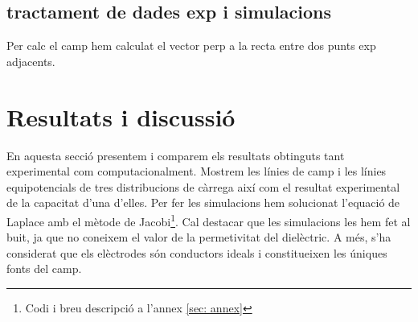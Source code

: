 \documentclass[11pt]{article}
\begin{document}
\subsection{tractament de dades exp i simulacions}
Per calc el camp hem calculat el vector perp a la recta entre dos punts exp adjacents.

\section{Resultats i discussió}\label{sec: resultats}
En aquesta secció presentem i comparem els resultats obtinguts tant experimental com computacionalment. Mostrem les línies de camp i les línies equipotencials de tres distribucions de càrrega així com el resultat experimental de la capacitat d'una d'elles. Per fer les simulacions hem solucionat l'equació de Laplace amb el mètode de Jacobi\footnote{Codi i breu descripció a l'annex \ref{sec: annex}}. Cal destacar que les simulacions les hem fet al buit, ja que no coneixem el valor de la permetivitat del dielèctric. A més, s'ha considerat que els elèctrodes són conductors ideals i constitueixen les úniques fonts del camp.
\end{document}
